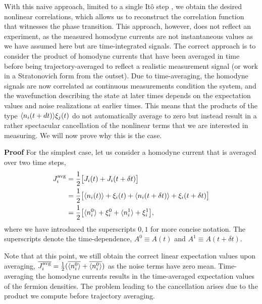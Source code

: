 With this naive approach, limited to a single It\^o step \cite{wiseman1993,wiseman1994, wiseman1994a}, we obtain the desired nonlinear correlations, which allows us to reconstruct the correlation function that witnesses the phase transition. This approach, however, does not reflect an experiment, as the measured homodyne currents are not instantaneous values as we have assumed here but are time-integrated signals. The correct approach is to consider the product of homodyne currents that have been averaged in time before being trajectory-averaged to reflect a realistic measurement signal (or work in a Stratonovich form from the outset). Due to time-averaging, the homodyne signals are now correlated as continuous measurements condition the system, and the wavefunction describing the state at later times depends on the expectation values and noise realizations at earlier times. This means that the products of the type $\langle n_{i}(t+dt)\rangle  \xi_{j}(t) $ do not automatically average to zero but instead result in a rather spectacular cancellation of the nonlinear terms that we are interested in measuring. We will now prove why this is the case.

\textbf{Proof}
For the simplest case, let us consider a homodyne current that is averaged over two time steps, 
\begin{align}
\begin{split}
    J_i^\text{avg}  &= \frac{1}{2} \big[ J_i(t)+J_i(t+\delta t) \big] \\ 
                    &= \frac{1}{2} \big[ \langle n_i(t)\rangle + \xi_i(t) + \langle n_i(t+\delta t)\rangle + \xi_i(t+\delta t) \big]\\
                    &= \frac{1}{2} \big[ \langle n_i^0\rangle + \xi_i^0 + \langle n_i^1\rangle + \xi_i^1 \big],
\end{split}
\end{align}
where we have introduced the superscripts $0, 1$ for more concise notation. The superscripts denote the time-dependence, $A^0 \equiv A(t)$ and $A^1 \equiv A(t+\delta t)$.

Note that at this point, we still obtain the correct linear expectation values upon averaging, $\overline{J_i^\text{avg}} = \frac{1}{2} (\overline{\langle n_i^0\rangle} + \overline{\langle n_i^0\rangle})$ as the noise terms have zero mean. Time-averaging the homodyne currents results in the time-averaged expectation values of the fermion densities. The problem leading to the cancellation arises due to the product we compute before trajectory averaging.

